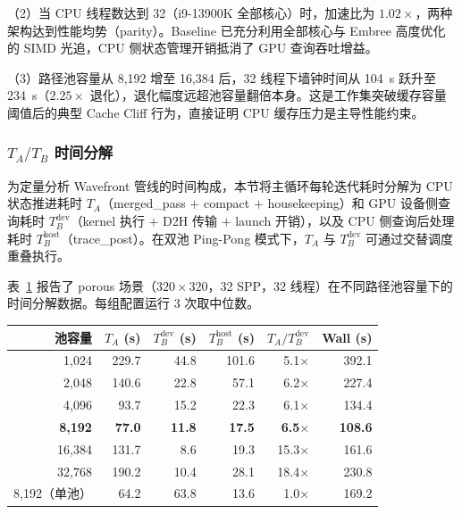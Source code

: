 （2）当 CPU 线程数达到 32（i9-13900K 全部核心）时，加速比为 $1.02\times$，两种架构达到性能均势（parity）。Baseline 已充分利用全部核心与 Embree 高度优化的 SIMD 光追，CPU 侧状态管理开销抵消了 GPU 查询吞吐增益。

（3）路径池容量从 8{,}192 增至 16{,}384 后，32 线程下墙钟时间从 104~s 跃升至 234~s（$2.25\times$ 退化），退化幅度远超池容量翻倍本身。这是工作集突破缓存容量阈值后的典型 Cache Cliff 行为，直接证明 CPU 缓存压力是主导性能约束。

\subsubsection{$T_A / T_B$ 时间分解}

为定量分析 Wavefront 管线的时间构成，本节将主循环每轮迭代耗时分解为 CPU 状态推进耗时 $T_A$（merged\_pass $+$ compact $+$ housekeeping）和 GPU 设备侧查询耗时 $T_B^{\text{dev}}$（kernel 执行 $+$ D2H 传输 $+$ launch 开销），以及 CPU 侧查询后处理耗时 $T_B^{\text{host}}$（trace\_post）。在双池 Ping-Pong 模式下，$T_A$ 与 $T_B^{\text{dev}}$ 可通过交替调度重叠执行。

表~\ref{tab:time-breakdown} 报告了 porous 场景（$320 \times 320$，32 SPP，32 线程）在不同路径池容量下的时间分解数据。每组配置运行 3 次取中位数。

\begin{table}[htbp]
  \centering
  \label{tab:time-breakdown}
  \small
  \begin{tabular}{rrrrrr}
    \toprule
    池容量 & $T_A$ (s) & $T_B^{\text{dev}}$ (s) & $T_B^{\text{host}}$ (s) & $T_A / T_B^{\text{dev}}$ & Wall (s) \\
    \midrule
    1{,}024  & 229.7 & 44.8 & 101.6 & 5.1$\times$ & 392.1 \\
    2{,}048  & 140.6 & 22.8 & 57.1  & 6.2$\times$ & 227.4 \\
    4{,}096  & 93.7  & 15.2 & 22.3  & 6.1$\times$ & 134.4 \\
    \textbf{8{,}192}  & \textbf{77.0}  & \textbf{11.8} & \textbf{17.5}  & \textbf{6.5$\times$} & \textbf{108.6} \\
    16{,}384 & 131.7 & 8.6  & 19.3  & 15.3$\times$ & 161.6 \\
    32{,}768 & 190.2 & 10.4 & 28.1  & 18.4$\times$ & 230.8 \\
    \midrule
    8{,}192（单池） & 64.2  & 63.8 & 13.6  & 1.0$\times$ & 169.2 \\
    \bottomrule
  \end{tabular}
\end{table}

